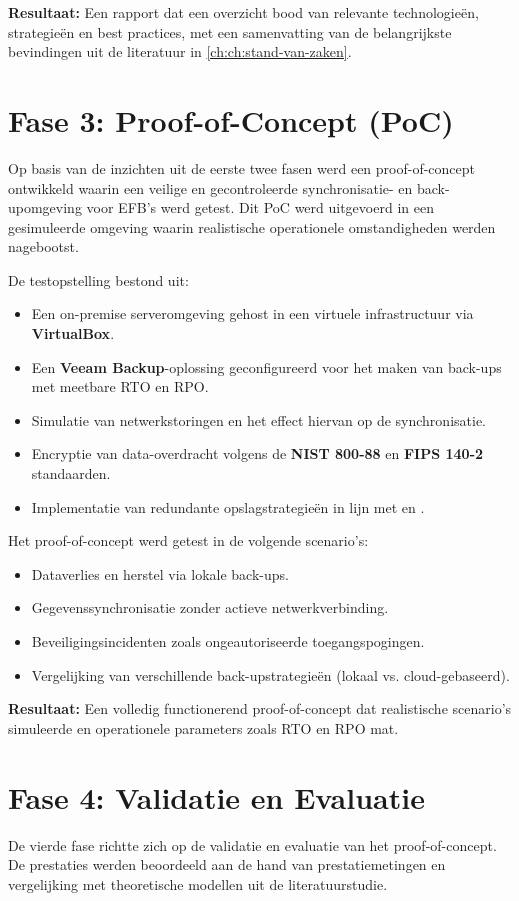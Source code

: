 \textbf{Resultaat:} Een rapport dat een overzicht bood van relevante technologieën, strategieën en best practices, met een samenvatting van de belangrijkste bevindingen uit de literatuur in \autoref{ch:ch:stand-van-zaken}.

\section{Fase 3: Proof-of-Concept (PoC)}
Op basis van de inzichten uit de eerste twee fasen werd een proof-of-concept ontwikkeld waarin een veilige en gecontroleerde synchronisatie- en back-upomgeving voor EFB’s werd getest. Dit PoC werd uitgevoerd in een gesimuleerde omgeving waarin realistische operationele omstandigheden werden nagebootst.

De testopstelling bestond uit:
\begin{itemize}
    \item Een on-premise serveromgeving gehost in een virtuele infrastructuur via \textbf{VirtualBox}.
    \item Een \textbf{Veeam Backup}-oplossing geconfigureerd voor het maken van back-ups met meetbare RTO en RPO.
    \item Simulatie van netwerkstoringen en het effect hiervan op de synchronisatie.
    \item Encryptie van data-overdracht volgens de \textbf{NIST 800-88} en \textbf{FIPS 140-2} standaarden.
    \item Implementatie van redundante opslagstrategieën in lijn met \textcite{AWSBackup} en \textcite{MicrosoftBackup}.
\end{itemize}

Het proof-of-concept werd getest in de volgende scenario’s:
\begin{itemize}
    \item Dataverlies en herstel via lokale back-ups.
    \item Gegevenssynchronisatie zonder actieve netwerkverbinding.
    \item Beveiligingsincidenten zoals ongeautoriseerde toegangspogingen.
    \item Vergelijking van verschillende back-upstrategieën (lokaal vs. cloud-gebaseerd).
\end{itemize}

\textbf{Resultaat:} Een volledig functionerend proof-of-concept dat realistische scenario’s simuleerde en operationele parameters zoals RTO en RPO mat.

\section{Fase 4: Validatie en Evaluatie}
De vierde fase richtte zich op de validatie en evaluatie van het proof-of-concept. De prestaties werden beoordeeld aan de hand van prestatiemetingen en vergelijking met theoretische modellen uit de literatuurstudie.

